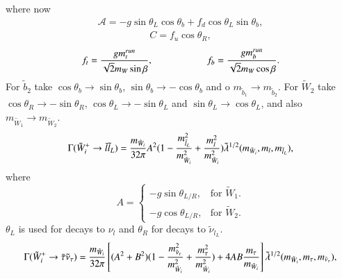 \documentclass[final,3p,times,pdflatex]{elsarticle}
\begin{document}
where now
\begin{equation}
\begin{aligned}
\mathcal{A} = -g\sin\theta_L\cos\theta_b + f_d \cos\theta_L\sin\theta_b,
\end{aligned}
\end{equation}
\begin{equation}
\begin{aligned}
C = f_u \cos\theta_R,
\end{aligned}
\end{equation}
\begin{equation}
\begin{aligned}
f_t = {g m_{t}^{run} \over \sqrt{2} m_W \sin{\beta} }, \: \: \: \: \: \: \: \: \: \: \: \: \: \: \: \: \: \: \: \: \: \: \: \: \:   f_b = {g m_{b}^{run} \over \sqrt{2} m_W \cos\beta}.
\end{aligned}
\end{equation}
For $\tilde{b}_2$ take $\cos\theta_b \rightarrow \sin\theta_b$, $\sin\theta_b \rightarrow -\cos\theta_b$ and o $m_{\tilde{b}_1} \rightarrow m_{\tilde{b}_2}$.
For $\tilde{W}_2$ take $\cos\theta_R \rightarrow -\sin\theta_R$, $\cos\theta_L \rightarrow -\sin\theta_L$ and $\sin\theta_L \rightarrow \cos\theta_L$, and also $m_{\tilde{W}_1} \rightarrow m_{\tilde{W}_2}$.
\begin{equation}\label{chllL}
\begin{aligned}
\Gamma (\tilde{W}_i^+ \rightarrow \bar{l} \tilde{l}_{L}) = {m_{\tilde{W}_i} \over 32\pi} A^2 (1- {m_{\tilde{l}_L}^2 \over m_{\tilde{W}_i}^2} + {m_{l}^2 \over m_{\tilde{W}_i}^2})  \tilde{\lambda}^{1/2}(m_{\tilde{W}_i},m_l, m_{\tilde{l}_L}),
\end{aligned}
\end{equation} 
where
\begin{equation}
  A=\begin{cases}
    -g \sin\theta_{L/R}, & \text{for $\tilde{W}_1$}.\\
    -g \cos\theta_{L/R}, & \text{for $\tilde{W}_2$}.
  \end{cases}
\end{equation}
$\theta_L$ is used for decays to $\nu_l$ and $\theta_R$ for decays to $\tilde{\nu}_{l_L}$.
\begin{equation}
\begin{aligned}\label{chtaunutau}
\Gamma (\tilde{W}_i^+ \rightarrow \bar{\tau} \tilde{\nu}_{\tau}) = {m_{\tilde{W}_i} \over 32\pi} \left[(A^2 + B^2)( 1 - {m_{\tilde{\nu}_{\tau}}^2 \over m_{\tilde{W}_{i}}^2} + {m_{\tau}^2 \over m_{\tilde{W}_{i}}^2 }) + 4AB {m_{\tau} \over m_{\tilde{W}_i}}\right] \tilde{\lambda}^{1/2}(m_{\tilde{W}_i},m_{\tau}, m_{\tilde{\nu}_{\tau}}),
\end{aligned}
\end{equation} 
\end{document}
